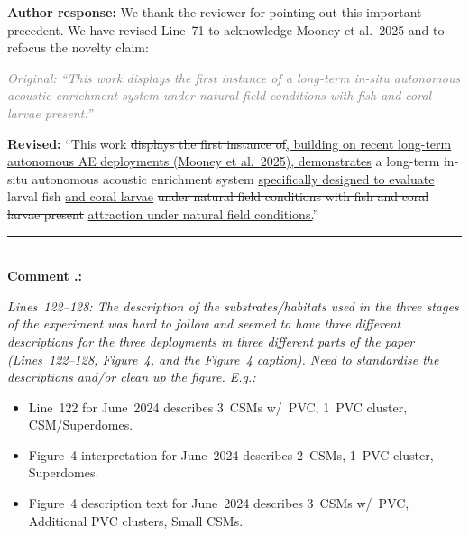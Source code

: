 \documentclass[12pt]{article}
\newcommand{\original}[1]{%
  \textcolor{gray}{\textit{Original: ``#1''}}}
\newcommand{\revised}[1]{%
  \textcolor{addcolor}{\textbf{Revised: }``#1''}}
\newcommand{\added}[1]{\textcolor{addcolor}{\uline{#1}}}
\newcommand{\deleted}[1]{\textcolor{delcolor}{\sout{#1}}}
\newcommand{\authornote}[1]{%
  \par\noindent\textcolor{notecolor}{\textbf{Author response:} #1}\par}
\newenvironment{reviewercomment}{%
  \par\noindent\textcolor{revcolor}\bgroup\itshape}{\egroup\par}
\newcounter{rcounter}[section]
\newcommand{\RC}[1]{%
  \stepcounter{rcounter}%
  \bigskip
  \noindent\rule{\linewidth}{0.4pt}\\[2pt]
  \textbf{Comment \arabic{section}.\arabic{rcounter}:}\\[4pt]
  \begin{reviewercomment}#1\end{reviewercomment}}
\newcommand{\AR}[1]{%
  \authornote{#1}}
\begin{document}
\AR{We thank the reviewer for pointing out this important precedent.
We have revised Line~71 to acknowledge Mooney et al.\ 2025 and to refocus
the novelty claim:

\original{This work displays the first instance of a long-term in-situ
autonomous acoustic enrichment system under natural field conditions with fish
and coral larvae present.}

\revised{This work \deleted{displays the first instance of}\added{, building
on recent long-term autonomous AE deployments (Mooney et al.\ 2025),
demonstrates} a long-term in-situ autonomous acoustic enrichment system
\added{specifically designed to evaluate} larval fish \added{and coral larvae}
\deleted{under natural field conditions with fish and coral larvae present}
\added{attraction under natural field conditions.}}}

\RC{Lines~122--128: The description of the substrates/habitats used in the
three stages of the experiment was hard to follow and seemed to have three
different descriptions for the three deployments in three different parts of
the paper (Lines~122--128, Figure~4, and the Figure~4 caption). Need to
standardise the descriptions and/or clean up the figure. E.g.:
\begin{itemize}[noitemsep]
  \item Line~122 for June~2024 describes 3~CSMs w/~PVC, 1~PVC cluster,
    CSM/Superdomes.
  \item Figure~4 interpretation for June~2024 describes 2~CSMs, 1~PVC
    cluster, Superdomes.
  \item Figure~4 description text for June~2024 describes 3~CSMs w/~PVC,
    Additional PVC clusters, Small CSMs.
\end{itemize}}
\end{document}
